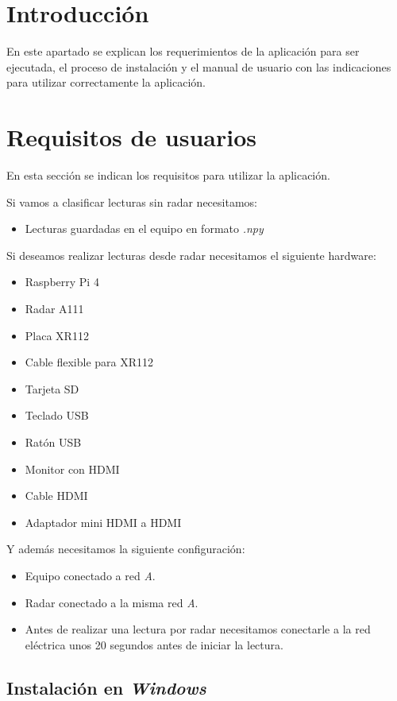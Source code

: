 
\section{Introducción}

En este apartado se explican los requerimientos de la aplicación para ser ejecutada, el proceso de instalación y el manual
de usuario con las indicaciones para utilizar correctamente la aplicación.

\section{Requisitos de usuarios}

En esta sección se indican los requisitos para utilizar la aplicación.

Si vamos a clasificar lecturas sin radar necesitamos:
\begin{itemize}
\item Lecturas guardadas en el equipo en formato \textit{.npy}
\end{itemize}

Si deseamos realizar lecturas desde radar necesitamos el siguiente hardware:
\begin{itemize}
\item Raspberry Pi 4
\item Radar A111
\item Placa XR112
\item Cable flexible para XR112
\item Tarjeta SD
\item Teclado USB
\item Ratón USB
\item Monitor con HDMI
\item Cable HDMI
\item Adaptador mini HDMI a HDMI
\end{itemize}

Y además necesitamos la siguiente configuración:
\begin{itemize}
\item Equipo conectado a red \textit{A}.
\item Radar conectado a la misma red \textit{A}.
\item Antes de realizar una lectura por radar necesitamos conectarle a la red eléctrica unos 20 segundos antes de iniciar la lectura.
\end{itemize}


\subsection{Instalación en \textit{Windows}}

